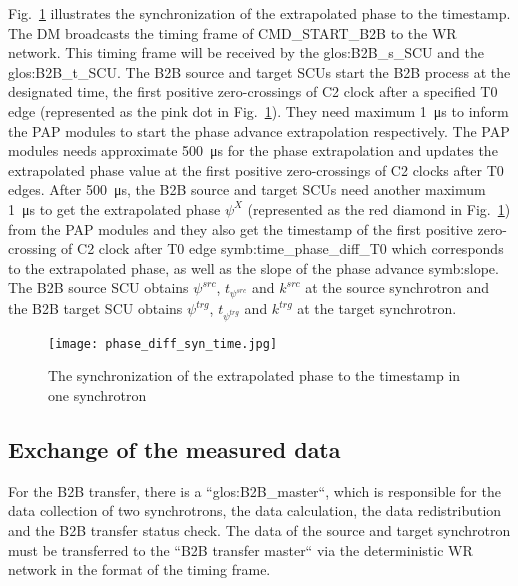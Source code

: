 Fig.~\ref{phase_diff_syn_time} illustrates the synchronization of the extrapolated phase to the timestamp. The DM broadcasts the timing frame of CMD\_START\_B2B to the WR network. This timing frame will be received by the \gls{glos:B2B_s_SCU} and the \gls{glos:B2B_t_SCU}. The B2B source and target SCUs start the B2B process at the designated time, the first positive zero-crossings of C2 clock after a specified T0 edge (represented as the pink dot in Fig.~\ref{phase_diff_syn_time}). They need maximum \SI{1}{\us} to inform the PAP modules to start the phase advance extrapolation respectively. The PAP modules needs approximate \SI{500}{\us} for the phase extrapolation and updates the extrapolated phase value at the first positive zero-crossings of C2 clocks after T0 edges. After \SI{500}{\us}, the B2B source and target SCUs need another maximum \SI{1}{\us} to get the extrapolated phase $\psi^X$ (represented as the red diamond in Fig.~\ref{phase_diff_syn_time}) from the PAP modules and they also get the timestamp of the first positive zero-crossing of C2 clock after T0 edge \gls{symb:time_phase_diff_T0} which corresponds to the extrapolated phase, as well as the slope of the phase advance \gls{symb:slope}. The B2B source SCU obtains $\psi^\mathit{src}$, $t_{\mathit{\psi^\mathit{src}}}$ and $k^\mathit{src}$ at the source synchrotron and the B2B target SCU obtains $\psi^\mathit{trg}$, $t_{\mathit{\psi^\mathit{trg}}}$ and $k^\mathit{trg}$ at the target synchrotron.
 \begin{figure}[!htb]
   \centering   
   \texttt{[image: phase\_diff\_syn\_time.jpg]}
   \caption{The synchronization of the extrapolated phase to the timestamp in one synchrotron}
   \label{phase_diff_syn_time}
\end{figure}
\subsection{Exchange of the measured data}

For the B2B transfer, there is a ``\gls{glos:B2B_master}``, which is responsible for the data collection of two synchrotrons, the data calculation, the data redistribution and the B2B transfer status check. The data of the source and target synchrotron must be transferred to the ``B2B transfer master`` via the deterministic WR network in the format of the timing frame.
 
